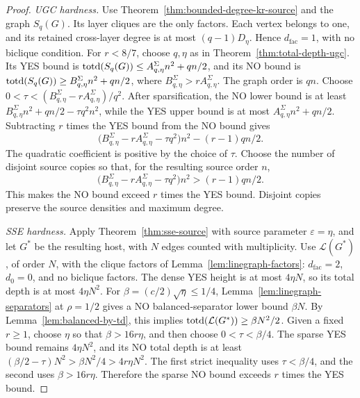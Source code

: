 \begin{proof}
\emph{\textup{UGC} hardness.}
Use Theorem~\ref{thm:bounded-degree-kr-source} and the graph
$S_q(G)$. Its layer cliques are the only factors. Each vertex
belongs to one, and its retained cross-layer degree is at most
$(q-1)D_\eta$. Hence $d_{\mathrm{fac}}=1$, with no biclique condition. For
$r<8/7$, choose $q,\eta$ as in
Theorem~\ref{thm:total-depth-ugc}. Its YES bound is
$\operatorname{totd}(S_q(G))\le A^\Sigma_{q,\eta}n^2+qn/2$, and its NO bound is
$\operatorname{totd}(S_q(G))\ge B^\Sigma_{q,\eta}n^2+qn/2$, where
$B^\Sigma_{q,\eta}>rA^\Sigma_{q,\eta}$. The graph order
is $qn$. Choose
$0<\tau<(B^\Sigma_{q,\eta}-rA^\Sigma_{q,\eta})/q^2$.
After sparsification, the NO lower bound is at least
$B^\Sigma_{q,\eta}n^2+qn/2-\tau q^2n^2$, while the YES upper
bound is at most $A^\Sigma_{q,\eta}n^2+qn/2$. Subtracting $r$ times
the YES bound from the NO bound gives
\[
 \bigl(B^\Sigma_{q,\eta}-rA^\Sigma_{q,\eta}-\tau q^2\bigr)n^2
 -(r-1)qn/2.
\]
The quadratic coefficient is positive by the choice of $\tau$.
Choose the number of disjoint source copies so that, for the resulting
source order $n$,
\[
 \bigl(B^\Sigma_{q,\eta}-rA^\Sigma_{q,\eta}-\tau q^2\bigr)n^2
 >(r-1)qn/2.
\]
This makes the NO bound exceed $r$ times the YES bound. Disjoint
copies preserve the source densities and maximum degree.

\emph{\textup{SSE} hardness.}
Apply Theorem~\ref{thm:sse-source} with source parameter
$\varepsilon=\eta$, and let $G^*$ be the resulting host, with $N$
edges counted with multiplicity. Use $\mathcal L(G^*)$, of order $N$,
with the clique factors of Lemma~\ref{lem:linegraph-factors}:
$d_{\mathrm{fac}}=2$, $d_0=0$, and no biclique factors. The dense YES height is at most
$4\eta N$, so its total depth is at most $4\eta N^2$.
For $\beta=(c/2)\sqrt\eta\le1/4$,
Lemma~\ref{lem:linegraph-separators} at $\rho=1/2$ gives a NO
balanced-separator lower bound $\beta N$. By
Lemma~\ref{lem:balanced-by-td}, this implies
$\operatorname{totd}(\mathcal L(G^*))\ge\beta N^2/2$.
Given a fixed $r\ge1$, choose $\eta$ so that $\beta>16r\eta$,
and then choose $0<\tau<\beta/4$. The sparse YES bound remains
$4\eta N^2$, and its NO total depth is at least
$(\beta/2-\tau)N^2>\beta N^2/4>4r\eta N^2$.
The first strict inequality uses $\tau<\beta/4$, and the second uses
$\beta>16r\eta$.
Therefore the sparse NO bound exceeds $r$ times the YES bound.

\end{proof}
